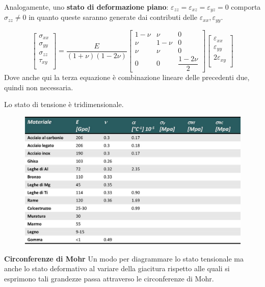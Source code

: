 \documentclass{article}
\begin{document}
\begin{adjustwidth}{2in}{}
Analogamente, uno \textbf{stato di deformazione piano}: $ \varepsilon_{zz} = \varepsilon_{xz} = \varepsilon_{yz} = 0$ comporta $\sigma_{zz} \ne 0$ in quanto queste saranno generate dai contributi delle $\varepsilon_{xx}, \varepsilon_{yy}$.

	\[
	\left[ \begin{array}{c}
		\sigma_{xx} \\
		\sigma_{yy} \\
		\sigma_{zz} \\
		\tau_{xy} \\
	\end{array} \right] = \frac{E}{(1+\nu)(1-2\nu)} \left[ \begin{array}{ccc}
		1 - \nu & \nu & 0 \\
		\nu & 	1 - \nu & 0 \\
		\nu & \nu & 0\\
		0 & 0  & \dfrac{1 - 2\nu}{2} 
	\end{array}\right] \left[\begin{array}{c}
		\varepsilon_{xx} \\
		\varepsilon_{yy} \\
		2\varepsilon_{xy} \\
	\end{array} \right] 
	\]	
	Dove anche qui la terza equazione è combinazione lineare delle precedenti due, quindi non necessaria. \newline 

	Lo stato di tensione è tridimensionale. 

\begin{figure}[H]
	\centering
	\includegraphics[width=0.8\linewidth]{immagini/1.PARTE7_Pagina_37}
\end{figure} 
\newpage


{\Large \textbf{Circonferenze di Mohr}} \newline 	
	Un modo per diagrammare lo stato tensionale ma anche lo stato deformativo al variare della giacitura rispetto alle quali si esprimono tali grandezze passa attraverso le circonferenze di Mohr. \newline 
	

\end{adjustwidth}
\end{document}
